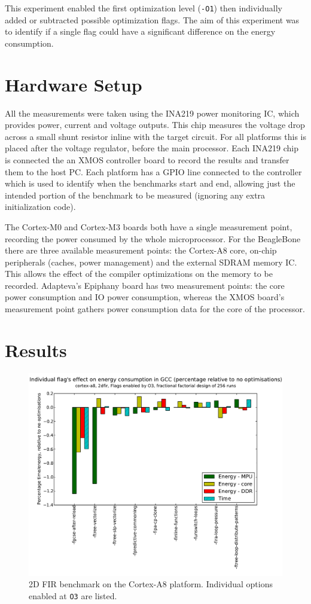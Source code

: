 \documentclass[twocolumn]{article}
\newcommand{\nsection}[1]{\section{\bfseries #1}}
\let\oldcaption\caption
\renewcommand{\caption}[1]{\oldcaption{\textup{#1}}}
\begin{document}
This experiment enabled the first optimization level (\texttt{-O1}) then individually added or subtracted possible optimization flags. The aim of this experiment was to identify if a single flag could have a significant difference on the energy consumption.

\nsection{Hardware Setup}

All the measurements were taken using the INA219 power monitoring IC\cite{INA219}, which provides power, current and voltage outputs. This chip measures the voltage drop across a small shunt resistor inline with the target circuit. For all platforms this is placed after the voltage regulator, before the main processor. Each INA219 chip is connected the an XMOS controller board to record the results and transfer them to the host PC. Each platform has a GPIO line connected to the controller which is used to identify when the benchmarks start and end, allowing just the intended portion of the benchmark to be measured (ignoring any extra initialization code).

The Cortex-M0 and Cortex-M3 boards both have a single measurement point, recording the power consumed by the whole microprocessor. For the BeagleBone there are three available measurement points: the Cortex-A8 core, on-chip peripherals (caches, power management) and the external SDRAM memory IC. This allows the effect of the compiler optimizations on the memory to be recorded. Adapteva's Epiphany board has two measurement points: the core power consumption and IO power consumption, whereas the XMOS board's measurement point gathers power consumption data for the core of the processor.

\nsection{Results}

\begin{figure}[t]
	\includegraphics[width=\linewidth,clip,trim=0.5cm 0 2cm 1.8cm]{cortex-a8/O3_main_effects_2dfir.pdf}
	\caption{2D FIR benchmark on the Cortex-A8 platform. Individual options enabled at \texttt{O3} are listed.}
	\label{Fig:O3_2dfir_A8}
\end{figure}
\end{document}
